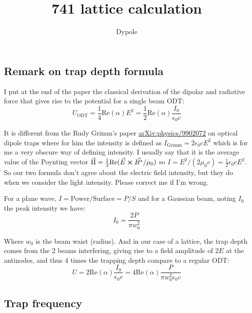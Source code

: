 \documentclass[reprint,amsmath,amssymb,aps,nofootinbib]{revtex4-1}
\begin{document}
\title{741 lattice calculation}

\author{Dypole}

\maketitle


\subsection{Remark on trap depth formula}

I put at the end of the paper the classical derivation of the dipolar and radiative force that gives rise to the potential for a single beam ODT:
\begin{equation}
\label{trap_depth}
U_{\text{ODT}} = \frac{1}{4}\text{Re}(\alpha)E^{2} = \frac{1}{2}\text{Re}(\alpha)\frac{I_{0}}{\epsilon_{0}c}
\end{equation}

It is different from the Rudy Grimm's paper \url{arXiv:physics/9902072} on optical dipole traps where for him the intensity is defined as $I_{\text{Grimm}} = 2\epsilon_{0}cE^{2}$ which is for me a very obscure way of defining intensity. I usually say that it is the average value of the Poynting vector $\vec{\Pi}=\frac12\text{Re}(\vec{E}\cross\vec{B^{*}}/\mu_{0}) $ so $I = E^{2}/(2\mu_{0}c)=\frac12\epsilon_{0}cE^{2}$. So our two formula don't agree about the electric field intensity, but they do when we consider the light intensity. Please correct me if I'm wrong.

For a plane wave, $I=\text{Power}/\text{Surface}=P/S$ and for a Gaussian beam, noting $I_{0}$ the peak intensity we have:
\begin{equation}
\label{gaussian_intensity}
I_{0} = \frac{2P}{\pi w_{0}^{2}}
\end{equation}

Where $w_{0}$ is the beam waist (radius). And in our case of a lattice, the trap depth comes from the 2 beams interfering, giving rise to a field amplitude of $2E$ at the antinodes, and thus 4 times the trapping depth compare to a regular ODT:
\begin{equation}
U = 2\text{Re}(\alpha)\frac{I_{0}}{\epsilon_{0}c} = 4\text{Re}(\alpha)\frac{P}{\pi w_{0}^{2}\epsilon_{0}c}
\end{equation}

\subsection{Trap frequency}
\end{document}
